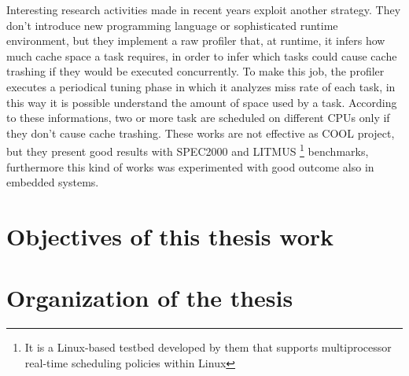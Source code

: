 Interesting research activities made in recent years exploit another strategy. They don't introduce new programming language or sophisticated runtime 
environment, but they implement a raw profiler that, at runtime, it infers how much cache space a task requires, in order to infer which 
tasks could cause cache trashing if they would be executed concurrently.
To make this job, the profiler executes a periodical tuning phase in which it analyzes miss rate of each task, in this way it is possible understand the 
amount of space used by a task. According to these informations, two or more
task are scheduled on different CPUs only if 
they don't cause cache trashing. These works are not effective as COOL project, but they present good results with SPEC2000 and 
LITMUS \footnote{It is a Linux-based testbed developed by them that supports multiprocessor real-time scheduling policies within Linux} benchmarks, 
furthermore this kind of works was experimented with good outcome also in embedded systems.


\section{Objectives of this thesis work}
\label{sec:ObjectiveOfThesis}


\section{Organization of the thesis}
\label{sec:OrganizationThesis}

